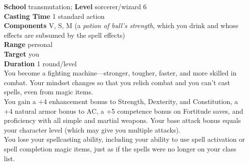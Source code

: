 \textbf{School} transmutation; \textbf{Level} sorcerer/wizard 6\\
\textbf{Casting Time} 1 standard action\\
\textbf{Components} V, S, M (a \textit{potion of bull's strength}, which you drink and whose effects are subsumed by the spell effects)\\
\textbf{Range} personal\\
\textbf{Target} you\\
\textbf{Duration} 1 round/level\\
You become a fighting machine—stronger, tougher, faster, and more skilled in combat. Your mindset changes so that you relish combat and you can't cast spells, even from magic items.\\
You gain a +4 enhancement bonus to Strength, Dexterity, and Constitution, a +4 natural armor bonus to AC, a +5 competence bonus on Fortitude saves, and proficiency with all simple and martial weapons. Your base attack bonus equals your character level (which may give you multiple attacks).\\
You lose your spellcasting ability, including your ability to use spell activation or spell completion magic items, just as if the spells were no longer on your class list.\\
